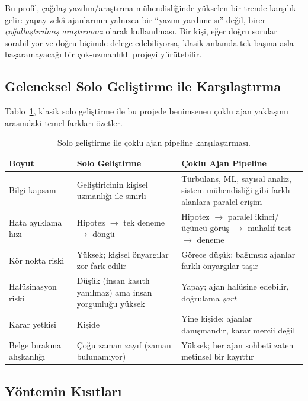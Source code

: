 Bu profil, çağdaş yazılım/araştırma mühendisliğinde yükselen bir trende
karşılık gelir: yapay zekâ ajanlarının yalnızca bir ``yazım yardımcısı''
değil, birer \emph{çoğullaştırılmış araştırmacı} olarak kullanılması.
Bir kişi, eğer doğru sorular sorabiliyor ve doğru biçimde delege
edebiliyorsa, klasik anlamda tek başına asla başaramayacağı bir
çok-uzmanlıklı projeyi yürütebilir.

\subsection{Geleneksel Solo Geliştirme ile Karşılaştırma}

Tablo~\ref{tab:ma_solo_vs_multi}, klasik solo geliştirme ile bu projede
benimsenen çoklu ajan yaklaşımı arasındaki temel farkları özetler.

\begin{table}[H]
\centering
\small
\begin{tabular}{p{4cm} p{5cm} p{5cm}}
\toprule
\textbf{Boyut} & \textbf{Solo Geliştirme} & \textbf{Çoklu Ajan Pipeline} \\
\midrule
Bilgi kapsamı &
Geliştiricinin kişisel uzmanlığı ile sınırlı &
Türbülans, ML, sayısal analiz, sistem mühendisliği gibi farklı
alanlara paralel erişim \\
\addlinespace
Hata ayıklama hızı &
Hipotez $\rightarrow$ tek deneme $\rightarrow$ döngü &
Hipotez $\rightarrow$ paralel ikinci/üçüncü görüş $\rightarrow$
muhalif test $\rightarrow$ deneme \\
\addlinespace
Kör nokta riski &
Yüksek; kişisel önyargılar zor fark edilir &
Görece düşük; bağımsız ajanlar farklı önyargılar taşır \\
\addlinespace
Halüsinasyon riski &
Düşük (insan kasıtlı yanılmaz) ama insan yorgunluğu yüksek &
Yapay; ajan halüsine edebilir, doğrulama \emph{şart} \\
\addlinespace
Karar yetkisi &
Kişide &
Yine kişide; ajanlar danışmandır, karar mercii değil \\
\addlinespace
Belge bırakma alışkanlığı &
Çoğu zaman zayıf (zaman bulunamıyor) &
Yüksek; her ajan sohbeti zaten metinsel bir kayıttır \\
\bottomrule
\end{tabular}
\caption{Solo geliştirme ile çoklu ajan pipeline karşılaştırması.}
\label{tab:ma_solo_vs_multi}
\end{table}

\subsection{Yöntemin Kısıtları}

